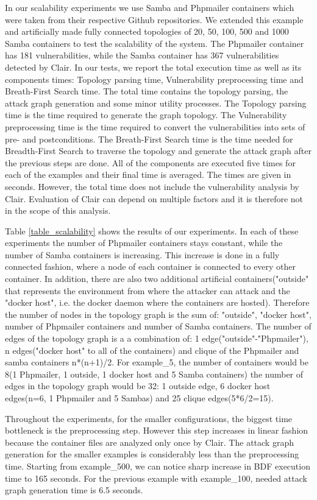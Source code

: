 In our scalability experiments we use Samba \cite{samba} and Phpmailer \cite{phpmailer} containers which were taken from their respective Github repositories. We extended this example and artificially made fully connected topologies of 20, 50, 100, 500 and 1000 Samba containers to test the scalability of the system. The Phpmailer container has 181 vulnerabilities, while the Samba container has 367 vulnerabilities detected by Clair. In our tests, we report the total execution time as well as its components times: Topology parsing time, Vulnerability preprocessing time and Breath-First Search time. The total time contains the topology parsing, the attack graph generation and some minor utility processes. The Topology parsing time is the time required to generate the graph topology. The Vulnerability preprocessing time is the time required to convert the vulnerabilities into sets of pre- and postconditions. The Breath-First Search time is the time needed for Breadth-First Search to traverse the topology and  generate the attack graph after the previous steps are done. All of the components are executed five times for each of the examples and their final time is averaged. The times are given in seconds.  However, the total time does not include the vulnerability analysis by Clair. Evaluation of Clair can depend on multiple factors and it is therefore not in the scope of this analysis.

Table \ref{table_scalability} shows the results of our experiments. In each of these experiments the number of Phpmailer containers stays constant, while the number of Samba containers is increasing. This increase is done in a fully connected fashion, where a node of each container is connected to every other container. In addition, there are also two additional artificial containers("outside" that represents the environment from where the attacker can attack and the "docker host", i.e. the docker daemon where the containers are hosted). Therefore the number of nodes in the topology graph is the sum of: "outside", "docker host", number of Phpmailer containers and number of Samba containers. The number of edges of the topology graph is a a combination of: 1 edge("outside"-"Phpmailer"), n edges("docker host" to all of the containers) and clique of the Phpmailer and samba containers n*(n+1)/2. For example\_5, the number of containers would be 8(1 Phpmailer, 1 outside, 1 docker host and 5 Samba containers) the number of edges in the topology graph would be 32: 1 outside edge, 6 docker host edges(n=6, 1 Phpmailer and 5 Sambas) and 25 clique edges(5*6/2=15).

Throughout the experiments, for the smaller configurations, the biggest time bottleneck is the preprocessing step. However this step increases in linear fashion because the container files are analyzed only once by Clair. The attack graph generation for the smaller examples is considerably less than the preprocessing time. Starting from example\_500, we can notice sharp increase in BDF execution time to 165 seconds. For the previous example with example\_100, needed attack graph generation time is 6.5 seconds.


